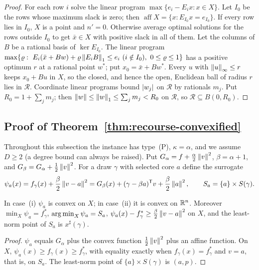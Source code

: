 \begin{proof}
For each row $i$ solve the linear program $\max\{e_i-E_ix:x\in X\}$. Let
$I_0$ be the rows whose maximum slack is zero; then
$\operatorname{aff}X=\{x:E_{I_0}x=e_{I_0}\}$. If every row lies in
$I_0$, $X$ is a point and $n'=0$. Otherwise average optimal solutions
for the rows outside $I_0$ to get $\bar x\in X$ with positive slack in
all of them. Let the columns of $B$ be a rational basis of
$\ker E_{I_0}$. The linear program
$\max\{\varrho:\ E_i(\bar x+Bw)+\varrho\left\lVert E_iB\right\rVert_1\le e_i\ (i\notin I_0),
\ 0\le\varrho\le1\}$ has a positive optimum $r$ at a rational point $w^*$;
put $x_0=\bar x+Bw^*$. Every $u$ with $\left\lVert u\right\rVert_\infty\le r$ keeps
$x_0+Bu$ in $X$, so the closed, and hence the open, Euclidean ball of
radius $r$ lies in $\mathcal R$. Coordinate linear programs bound
$\left\lvert w_j\right\rvert$ on $\mathcal R$ by rationals $m_j$. Put $R_0=1+\sum_jm_j$;
then $\left\lVert w\right\rVert\le\left\lVert w\right\rVert_1\le\sum_jm_j<R_0$ on $\mathcal R$, so
$\mathcal R\subseteq B(0,R_0)$.
\end{proof}

\subsection{Proof of Theorem~\ref{thm:recourse-convexified}}
\label{app:recourse-convexified}

Throughout this subsection the instance has type~(P), $\kappa=\alpha$,
and we assume $D\ge2$ (a degree bound can always be raised). Put
$G_\alpha=f+\frac\alpha2\left\lVert v\right\rVert^2$, $\beta=\alpha+1$, and
$G_\beta=G_\alpha+\frac12\left\lVert v\right\rVert^2$. For a draw $\gamma$ with selected
core $a$ define the surrogate
\[
 \psi_a(x)=f_\gamma(x)+\frac\beta2\left\lVert v-a\right\rVert^2
 =G_\beta(x)+(\gamma-\beta a)^{\mathsf T}v+\frac\beta2\left\lVert a\right\rVert^2,
 \qquad S_a=\{a\}\times S(\gamma).
\]

\begin{lemma}
\label{lem:recourse-surrogate}
In case~(i) $\psi_a$ is convex on $X$; in case~(ii) it is convex on
$\mathbb R^n$. Moreover $\min_X\psi_a=f_\gamma^*$, $\operatorname*{arg\,min}_X\psi_a=S_a$,
$\psi_a(x)-f_\gamma^*\ge\frac\beta2\left\lVert v-a\right\rVert^2$ on $X$, and the
least-norm point of $S_a$ is $x^\sharp(\gamma)$.
\end{lemma}

\begin{proof}
$\psi_a$ equals $G_\alpha$ plus the convex function $\frac12\left\lVert v\right\rVert^2$
plus an affine function. On $X$, $\psi_a(x)\ge f_\gamma(x)\ge f_\gamma^*$,
with equality exactly when $f_\gamma(x)=f_\gamma^*$ and $v=a$, that is,
on $S_a$. The least-norm point of $\{a\}\times S(\gamma)$ is $(a,p)$.
\end{proof}

